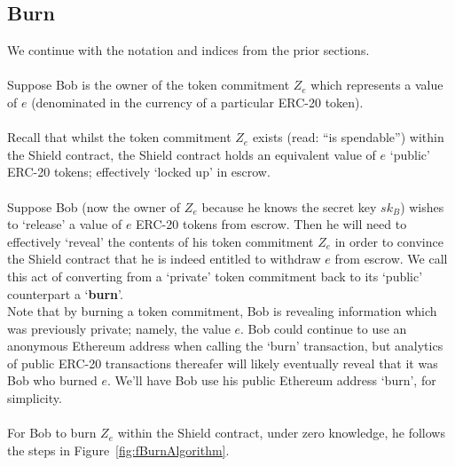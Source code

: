 \subsection{Burn}
\label{sec:20Burn}

We continue with the notation and indices from the prior sections.\\
\\
Suppose Bob is the owner of the token commitment $Z_e$ which represents a value of $e$ (denominated in the currency of a particular ERC-20 token).\\
\\
Recall that whilst the token commitment $Z_e$ exists (read: ``is spendable'') within the Shield contract, the Shield contract holds an equivalent value of $e$ `public' ERC-20 tokens; effectively `locked up' in escrow.\\
\\
Suppose Bob (now the owner of $Z_e$ because he knows the secret key $sk_B$) wishes to `release' a value of $e$ ERC-20 tokens from escrow.
Then he will need to effectively `reveal' the contents of his token commitment $Z_e$ in order to convince the Shield contract that he is indeed entitled to withdraw $e$ from escrow.
We call this act of converting from a `private' token commitment back to its `public' counterpart a `\textbf{burn}'.
\\
Note that by burning a token commitment, Bob is revealing information which was previously private; namely, the value $e$. Bob could continue to use an anonymous Ethereum address when calling the `burn' transaction, but analytics of public ERC-20 transactions thereafer will likely eventually reveal that it was Bob who burned $e$. We'll have Bob use his public Ethereum address `burn', for simplicity.\\
\\

\noindent
For Bob to burn $Z_e$ within the Shield contract, under zero knowledge, he follows the steps in Figure~\ref{fig:fBurnAlgorithm}.

